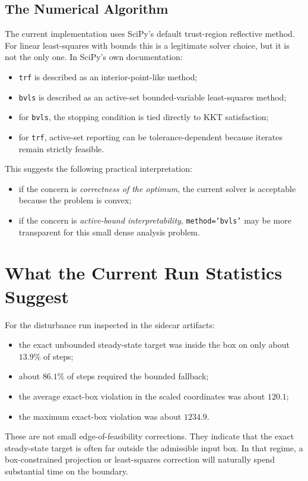 \documentclass[11pt]{article}
\begin{document}
\subsection{The Numerical Algorithm}

The current implementation uses SciPy's default trust-region reflective method. For linear least-squares with bounds this is a legitimate solver choice, but it is not the only one. In SciPy's own documentation:
\begin{itemize}
\item \texttt{trf} is described as an interior-point-like method;
\item \texttt{bvls} is described as an active-set bounded-variable least-squares method;
\item for \texttt{bvls}, the stopping condition is tied directly to KKT satisfaction;
\item for \texttt{trf}, active-set reporting can be tolerance-dependent because iterates remain strictly feasible.
\end{itemize}

This suggests the following practical interpretation:
\begin{itemize}
\item if the concern is \emph{correctness of the optimum}, the current solver is acceptable because the problem is convex;
\item if the concern is \emph{active-bound interpretability}, \texttt{method='bvls'} may be more transparent for this small dense analysis problem.
\end{itemize}

\section{What the Current Run Statistics Suggest}

For the disturbance run inspected in the sidecar artifacts:
\begin{itemize}
\item the exact unbounded steady-state target was inside the box on only about $13.9\%$ of steps;
\item about $86.1\%$ of steps required the bounded fallback;
\item the average exact-box violation in the scaled coordinates was about $120.1$;
\item the maximum exact-box violation was about $1234.9$.
\end{itemize}

These are not small edge-of-feasibility corrections. They indicate that the exact steady-state target is often far outside the admissible input box. In that regime, a box-constrained projection or least-squares correction will naturally spend substantial time on the boundary.
\end{document}
